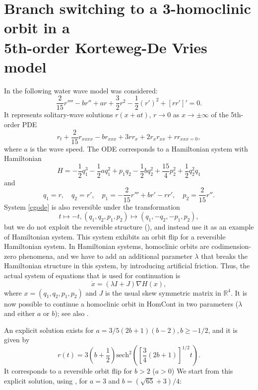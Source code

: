 \documentclass[12pt]{report}
\begin{document}
\section{ Branch switching to a 3-homoclinic orbit in
a\\ 5th-order Korteweg-De Vries model}

In  the following water wave model was considered:
\begin{equation}
\frac{2}{15}r''''-b r''+ar+\frac{3}{2}r^2-
\frac{1}{2}(r')^2+[rr']' = 0.
\label{cgode}
\end{equation}
It represents solitary-wave solutions $r(x+at)$, $r\to 0$ as $x\to
\pm\infty$ of the 5th-order PDE
\[
r_t+\frac{2}{15}r_{xxxx}-b r_{xxx}+3r r_x+2 r_x r_{xx}+r r_{xxx=0},
\]
where $a$ is the wave speed.
The ODE corresponds to a Hamiltonian system with Hamiltonian
\[ H=-\frac{1}{2}q_1^3-\frac{1}{2}a q_1^2+p_1 q_2-\frac{1}{2}b q_2^2+
\frac{15}{4}p_2^2+\frac{1}{2}q_2^2 q_1 \]
and 
\[q_1=r, \quad q_2=r', \quad p_1=-\frac{2}{15}r'''+br'-rr', \quad p_2=\frac{2}{15}r''.\]
System \eqref{cgode} is also reversible under the transformation 
\[ t \mapsto -t, (q_1,q_2,p_1,p_2)\mapsto (q_1,-q_2,-p_1,p_2),\] 
but we do not exploit the reversible structure (), and
instead use it as an example of Hamiltonian system.
This system exhibits an orbit flip for a reversible Hamiltonian system.
In Hamiltonian systems, homoclinic orbits are codimension-zero
phenomena, and we have to add an additional parameter $\lambda$ that breaks
the Hamiltonian structure in this system, by introducing artificial friction.
Thus, the actual system of equations that is
used for continuation is
\[\dot x=(\lambda I + J)\nabla H(x),\]
where $x=(q_1,q_2,p_1,p_2)$ and $J$ is the usual skew symmetric matrix
in $\mathbb{R}^4$.
It is now possible to continue a homoclinic orbit in {\cal HomCont} in two
parameters ($\lambda$ and either $a$ or $b$); see also
.

An explicit solution exists for $a=3/5(2b+1)(b-2), b\geq -1/2$, and it is
given by 
\[r(t)=3(b+\frac{1}{2})\mathrm{sech}^2\left([\frac{3}{4}(2b+1)]^{1/2}t\right).\]
It corresponds to a reversible orbit flip for $b>2$ ($a>0$) 
We start from this explicit solution, using , for $a=3$ and
$b=(\sqrt{65}+3)/4$:
\end{document}
